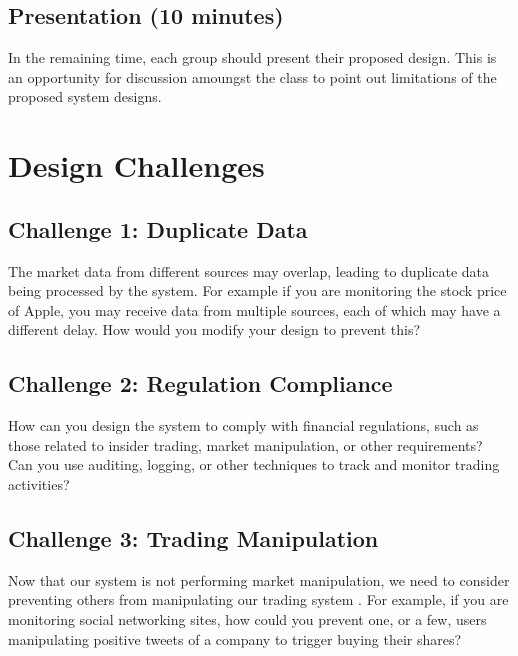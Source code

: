 \documentclass{csse4400}
\begin{document}
\subsection*{Presentation (10 minutes)}

In the remaining time,
each group should present their proposed design.
This is an opportunity for discussion amoungst the class to point out limitations of the proposed system designs.

\section{Design Challenges}

\subsection*{Challenge 1: Duplicate Data}
The market data from different sources may overlap,
leading to duplicate data being processed by the system.
For example if you are monitoring the stock price of Apple,
you may receive data from multiple sources,
each of which may have a different delay.
How would you modify your design to prevent this?

\subsection*{Challenge 2: Regulation Compliance}
How can you design the system to comply with financial regulations,
such as those related to insider trading, market manipulation, or other requirements?
Can you use auditing, logging, or other techniques to track and monitor trading activities?

\subsection*{Challenge 3: Trading Manipulation}
Now that our system is not performing market manipulation,
we need to consider preventing others from manipulating our trading system \cite{bot-manipulation}.
For example, if you are monitoring social networking sites,
how could you prevent one, or a few,
users manipulating positive tweets of a company to trigger buying their shares?



\end{document}
